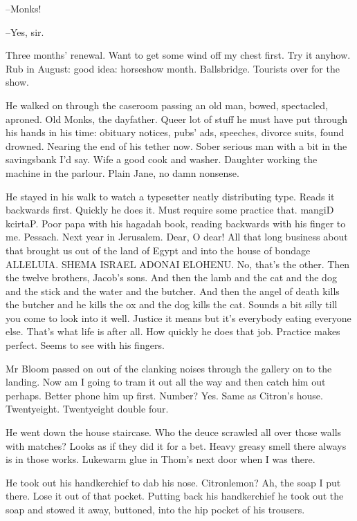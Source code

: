 --Monks!

--Yes, sir.

Three months' renewal. Want to get some wind off my chest first. Try
it anyhow. Rub in August: good idea: horseshow month. Ballsbridge.
Tourists over for the show.



He walked on through the caseroom passing an old man, bowed,
spectacled, aproned. Old Monks, the dayfather. Queer lot of stuff he must
have put through his hands in his time: obituary notices, pubs' ads,
speeches, divorce suits, found drowned. Nearing the end of his tether now.
Sober serious man with a bit in the savingsbank I'd say. Wife a good cook
and washer. Daughter working the machine in the parlour. Plain Jane, no
damn nonsense.



He stayed in his walk to watch a typesetter neatly distributing type.
Reads it backwards first. Quickly he does it. Must require some practice
that. mangiD kcirtaP. Poor papa with his hagadah book, reading
backwards with his finger to me. Pessach. Next year in Jerusalem. Dear, O
dear! All that long business about that brought us out of the land of
Egypt and into the house of bondage ALLELUIA. SHEMA ISRAEL ADONAI ELOHENU.
No, that's the other. Then the twelve brothers, Jacob's sons. And then the
lamb and the cat and the dog and the stick and the water and the butcher.
And then the angel of death kills the butcher and he kills the ox and the
dog kills the cat. Sounds a bit silly till you come to look into it well.
Justice it means but it's everybody eating everyone else. That's what life
is after all. How quickly he does that job. Practice makes perfect. Seems
to see with his fingers.

Mr Bloom passed on out of the clanking noises through the gallery on
to the landing. Now am I going to tram it out all the way and then catch
him out perhaps. Better phone him up first. Number? Yes. Same as Citron's
house. Twentyeight. Twentyeight double four.



He went down the house staircase. Who the deuce scrawled all over
those walls with matches? Looks as if they did it for a bet. Heavy greasy
smell there always is in those works. Lukewarm glue in Thom's next door
when I was there.

He took out his handkerchief to dab his nose. Citronlemon? Ah, the
soap I put there. Lose it out of that pocket. Putting back his
handkerchief he took out the soap and stowed it away, buttoned, into the
hip pocket of his trousers.

